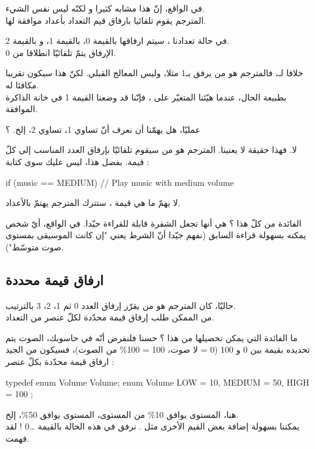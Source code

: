 في الواقع، إنّ هذا مشابه كثيرا و لكنّه ليس نفس الشيء.\\
المترجم يقوم تلقائيا بارفاق قيم التعداد بأعداد موافقة لها.


في حالة تعدادنا
،
سيتم ارفاقها بالقيمة 0،
بالقيمة 1،
و
بالقيمة 2.\\
الإرفاق يتمّ تلقائيّا انطلاقا من 0.

خلافا لـ،
فالمترجم هو من يرفق
بـ1 مثلا، وليس المعالج القبلي. لكنّ هذا سيكون تقريبا مكافئا له.\\
بطبيعة الحال، عندما هيّئنا المتغيّر
على
،
فإنّنا قد وضعنا القيمة 1 في خانة الذاكرة الموافقة.

\begin{question}
عمليّا، هل يهمّنا أن نعرف أنّ
تساوي 1،
تساوي 2، إلخ. ؟
\end{question}

لا. فهذا حقيقة لا يعنينا. المترجم هو من سيقوم تلقائيّا بإرفاق العدد المناسب إلى كلّ قيمة. بفضل هذا، ليس عليك سوى كتابة :
\begin{Csource}
if (music == MEDIUM)
{
	// Play music with medium volume
}
\end{Csource}
لا يهمّ ما هي قيمة
،
ستترك المترجم يهتمّ بالأعداد.

الفائدة من كلّ  هذا ؟  هي أنها تجعل الشفرة قابلة للقراءة جيّدا. في الواقع، أيّ شخص يمكنه بسهولة قراءة
السابق (نفهم جيّدا أنّ الشرط يعني "إن كانت الموسيقى بمستوى صوت متوسّط").

\subsection{ارفاق قيمة محددة}
حاليّا، كان المترجم هو من يقرّر إرفاق العدد 0 ثم 1، 2، 3
 بالترتيب.\\
من الممكن طلب إرفاق قيمة محدّدة لكلّ عنصر من التعداد.

ما الفائدة التي يمكن تحصيلها من هذا ؟ حسنا فلنفرض أنّه في حاسوبك، الصوت يتم تحديده بقيمة بين 0 و 100 (0 = لا صوت، 100 = 100\%
من الصوت)، فسيكون من الجيد ارفاق قيمة محدّدة بكلّ عنصر :
\begin{Csource}
typedef enum Volume Volume;
enum Volume
{
	LOW = 10, MEDIUM = 50, HIGH = 100
};
\end{Csource}
هنا، المستوى
يوافق 10\%
من المستوى، المستوى
يوافق 50\%،
إلخ.\\
يمكننا بسهولة إضافة بعض القيم الأخرى مثل
.
نرفق في هذه الحالة
بالقيمة \dots 0 ! لقد فهمت.

